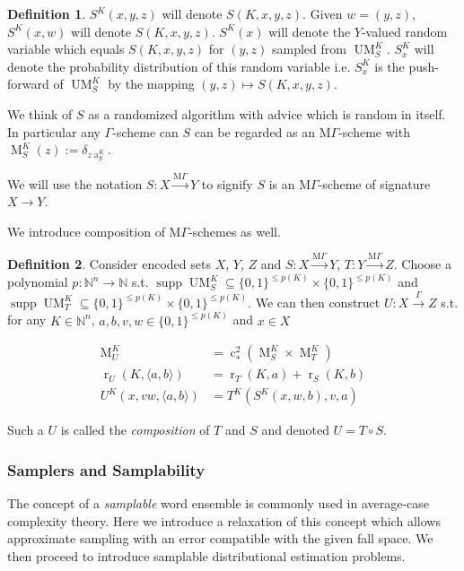 \documentclass{article}
\numberwithin{equation}{section}
\theoremstyle{definition}
\newtheorem{definition}{Definition}[section]
\theoremstyle{plain}
\newcommand{\Bool}{\{0,1\}}
\DeclareMathOperator{\Supp}{supp}
\DeclareMathOperator{\R}{r}
\DeclareMathOperator{\A}{a}
\DeclareMathOperator{\M}{M}
\DeclareMathOperator{\UM}{UM}
\DeclareMathOperator{\En}{c}
\newcommand{\Nats}{\mathbb{N}}
\newcommand{\Chev}[1]{\langle #1 \rangle}
\newcommand{\MGrow}{\mathrm{M}\Gamma}
\newcommand{\Scheme}{\xrightarrow{\Gamma}}
\newcommand{\MScheme}{\xrightarrow{\MGrow}}
\begin{document}
\begin{samepage}
\begin{definition}
$S^K(x,y,z)$ will denote $S(K,x,y,z)$. Given $w=(y,z)$, $S^K(x,w)$ will denote $S(K,x,y,z)$. $S^K(x)$ will denote the $Y$-valued random variable which equals $S(K,x,y,z)$ for $(y,z)$ sampled from $\UM_S^K$. $S_x^K$ will denote the probability distribution of this random variable i.e. $S_x^K$ is the push-forward of $\UM_S^K$ by the mapping $(y,z) \mapsto S(K,x,y,z)$.

We think of $S$ as a randomized algorithm with advice which is random in itself. In particular any $\Gamma$-scheme can $S$ can be regarded as an $\MGrow$-scheme with $\M_S^K(z):=\delta_{z\A_S^K}$.

We will use the notation $S: X \MScheme Y$ to signify $S$ is an $\MGrow$-scheme of signature $X \rightarrow Y$.

\end{definition}
\end{samepage}

We introduce composition of ${\MGrow}$-schemes as well.

\begin{samepage}
\begin{definition}

Consider encoded sets $X$, $Y$, $Z$ and $S: X \MScheme Y$, $T: Y \MScheme Z$. Choose a polynomial $p: \Nats^n \rightarrow \Nats$ s.t. $\Supp \UM_S^K \subseteq \Bool^{\leq p(K)} \times \Bool^{\leq p(K)}$ and $\Supp \UM_T^K \subseteq \Bool^{\leq p(K)} \times \Bool^{\leq p(K)}$. We can then construct $U: X \Scheme Z$ s.t. for any $K \in \Nats^n$, $a,b,v,w \in \Bool^{\leq p(K)}$ and $x \in X$

\begin{align}
\M_U^K &= \En_*^2(\M_S^K \times \M_T^K) \\
\R_U(K, \Chev{a,b}) &= \R_T(K,a)+\R_S(K,b) \\
U^K(x,vw,\Chev{a,b}) &= T^K(S^K(x,w,b),v,a)
\end{align}

Such a $U$ is called the \emph{composition} of $T$ and $S$ and denoted $U = T \circ S$.

\end{definition}
\end{samepage}

\subsubsection{Samplers and Samplability}

The concept of a \emph{samplable} word ensemble is commonly used in average-case complexity theory. Here we introduce a relaxation of this concept which allows approximate sampling with an error compatible with the given fall space. We then proceed to introduce samplable distributional estimation problems.
\end{document}
